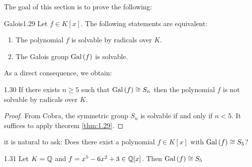\documentclass[twoside = false,	%
		headsepline,		%
		parskip = true,
		]{scrbook}						%
\begin{document}
        The goal of this section is to prove the following:
        \begin{theorem}{Galois}{1.29}
            Let $f\in K[x]$. The following statements are equivalent:
            \begin{enumerate}
                \item The polynomial $f$ is solvable by radicals over $K$.
                \item The Galois group $\mathrm{Gal}\left( f\right)$ is solvable.
            \end{enumerate}
        \end{theorem}
        As a direct consequence, we obtain:
        \begin{corollary}{}{1.30}
            If there exists $n\geq 5$ such that $\mathrm{Gal}\left( f\right)\cong S_n$ then the polynomial $f$ is not solvable by radicals over $K$.
        \end{corollary}
        \begin{proof}
        From Cobra, the symmetric group $S_n$ is solvable if and only if $n<5$. It suffices to apply theorem \ref{thm:1.29}.
        \end{proof}
        it is natural to ask: Does there exist a polynomial $f\in K[x]$ with $\mathrm{Gal}\left( f\right)\cong S_5$?
        \begin{proposition}{}{1.31}
            Let $K=\mathbb Q$ and $f = x^5-6x^2+3\in\mathbb Q[x]$. Then $\mathrm{Gal}\left( f\right) \cong S_5$
        \end{proposition}
\end{document}
